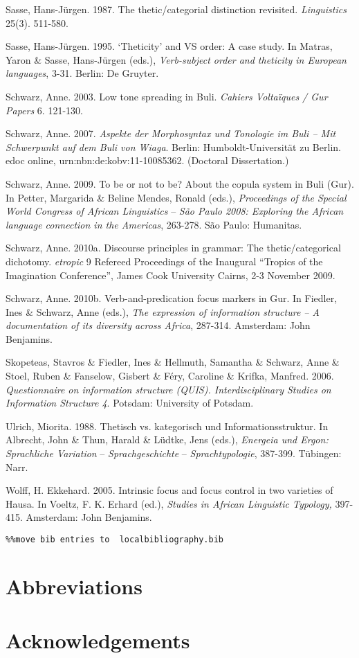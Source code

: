 \documentclass[output=paper]{langsci/langscibook}
\begin{document}
Sasse, Hans-Jürgen. 1987. The thetic/categorial distinction revisited. \textit{Linguistics} 25(3). 511-580.

Sasse, Hans-Jürgen. 1995. ‘Theticity’ and VS order: A case study. In Matras, Yaron \& Sasse, Hans-Jürgen (eds.), \textit{Verb-subject order and theticity in European languages}, 3-31. Berlin: De Gruyter.

Schwarz, Anne. 2003. Low tone spreading in Buli. \textit{Cahiers Voltaïques / Gur Papers} 6. 121-130.

Schwarz, Anne. 2007. \textit{Aspekte der Morphosyntax und Tonologie im Buli – Mit Schwerpunkt auf dem Buli von Wiaga}. Berlin: Humboldt-Universität zu Berlin. edoc online, urn:nbn:de:kobv:11-10085362. (Doctoral Dissertation.)

Schwarz, Anne. 2009. To be or not to be? About the copula system in Buli (Gur). In Petter, Margarida \& Beline Mendes, Ronald (eds.), \textit{Proceedings of the Special World Congress of African Linguistics }–\textit{ São Paulo 2008: Exploring the African language connection in the Americas}, 263-278. São Paulo: Humanitas.

Schwarz, Anne. 2010a. Discourse principles in grammar: The thetic/categorical dichotomy. \textit{etropic} 9 Refereed Proceedings of the Inaugural “Tropics of the Imagination Conference”, James Cook University Cairns, 2-3 November 2009.

Schwarz, Anne. 2010b. Verb-and-predication focus markers in Gur. In Fiedler, Ines \& Schwarz, Anne (eds.), \textit{The expression of information structure – A documentation of its diversity across Africa}, 287-314. Amsterdam: John Benjamins.

Skopeteas, Stavros \& Fiedler, Ines \& Hellmuth, Samantha  \& Schwarz, Anne \& Stoel, Ruben \& Fanselow, Gisbert \& Féry, Caroline  \& Krifka, Manfred. 2006. \textit{Questionnaire on information structure (QUIS). Interdisciplinary Studies on Information Structure 4}. Potsdam: University of Potsdam.

Ulrich, Miorita. 1988. Thetisch vs. kategorisch und Informationsstruktur. In Albrecht, John \& Thun, Harald \& Lüdtke, Jens (eds.), \textit{Energeia und Ergon: Sprachliche Variation }–\textit{ Sprachgeschichte }–\textit{ Sprachtypologie}, 387-399. Tübingen: Narr.

Wolff, H. Ekkehard. 2005. Intrinsic focus and focus control in two varieties of Hausa. In Voeltz, F. K. Erhard (ed.), \textit{Studies in African Linguistic Typology, }397-415. Amsterdam: John Benjamins.


\begin{verbatim}%%move bib entries to  localbibliography.bib
\end{verbatim}

\section*{Abbreviations}
\section*{Acknowledgements}

\printbibliography[heading=subbibliography,notkeyword=this]
\end{document}
